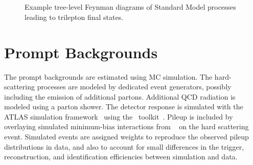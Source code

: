 \begin{figure}[p]
{	} \\
	 \\
	\caption{Example tree-level Feynman diagrams of Standard Model processes leading to trilepton final states.}
	\label{fig:multilepton-feynman-diagrams}
\end{figure}


\section{Prompt Backgrounds}\label{sec:prompt-backgrounds}
The prompt backgrounds are estimated using MC simulation. The hard-scattering processes are modeled by dedicated event generators, possibly including the emission of additional partons. Additional QCD radiation is modeled using a parton shower. The detector response is simulated with the ATLAS simulation framework~\cite{TheATLASCollaboration:2010et} using the \geant\ toolkit~\cite{Agostinelli:2002hh}. Pileup is included by overlaying simulated minimum-bias interactions from \pythia~\cite{pythia6} on the hard scattering event. Simulated events are assigned weights to reproduce the observed pileup distributions in data, and also to account for small differences in the trigger, reconstruction, and identification efficiencies between simulation and data. 

